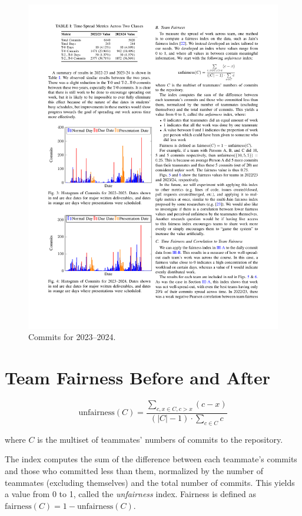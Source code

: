 \documentclass[poster, a1, plainboxedsections]{sciposter}
\begin{document}
\begin{multicols}{2}
\begin{figure}[h!]
\centering
\includegraphics[width=0.7\linewidth]{../figures/HistCommits2023-24.pdf}
\caption{Commits for 2023--2024.}\label{Fig_23_24Timeline}
\end{figure}

\section*{Team Fairness Before and After}

$$
\text{unfairness}(C) = \frac{ \sum\limits_{c, x \in C, c > x} (c-x)}{(\left|C\right| -
1) \cdot \sum\limits_{c \in C} c}
$$

\noindent where $C$ is the multiset of teammates' numbers of commits to the 
repository.

The index computes the sum of the difference between each teammate's commits and
those who committed less than them, normalized by the number of teammates
(excluding themselves) and the total number of commits. This yields a value from
0 to 1, called the \textit{unfairness} index. Fairness is defined as
$\text{fairness}(C) = 1 - \text{unfairness}(C)$.


\end{multicols}
\end{document}
